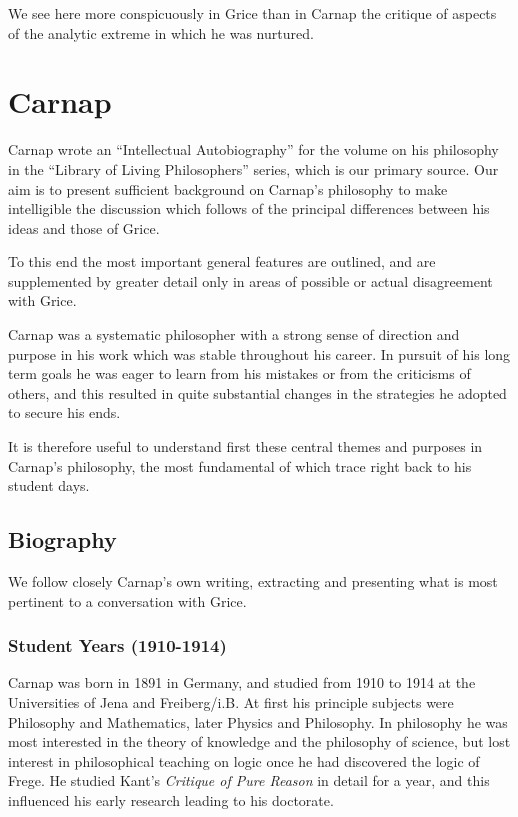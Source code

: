 \documentclass[10pt,titlepage]{book}
\begin{document}
We see here more conspicuously in Grice than in Carnap the critique of aspects of the analytic extreme in which he was nurtured.


\chapter{Carnap}

Carnap wrote an ``Intellectual Autobiography''\cite{carnap63} for the volume on his philosophy\cite{carnap63a} in the ``Library of Living Philosophers'' series, which is our primary source.
Our aim is to present sufficient background on Carnap's philosophy to make intelligible the discussion which follows of the principal differences between his ideas and those of Grice.

To this end the most important general features are outlined, and are supplemented by greater detail only in areas of possible or actual disagreement with Grice.

Carnap was a systematic philosopher with a strong sense of direction and purpose in his work which was stable throughout his career.
In pursuit of his long term goals he was eager to learn from his mistakes or from the criticisms of others, and this resulted in quite substantial changes in the strategies he adopted to secure his ends.

It is therefore useful to understand first these central themes and purposes in Carnap's philosophy, the most fundamental of which trace right back to his student days.

\section{Biography}

We follow closely Carnap's own writing, extracting and presenting what is most pertinent to a conversation with Grice.

\subsection{Student Years (1910-1914)}

Carnap was born in 1891 in Germany, and studied from 1910 to 1914 at the Universities of Jena and Freiberg/i.B.
At first his principle subjects were Philosophy and Mathematics, later Physics and Philosophy.
In philosophy he was most interested in the theory of knowledge and the philosophy of science, but lost interest in philosophical teaching on logic once he had discovered the logic of Frege.
He studied Kant's \emph{Critique of Pure Reason} in detail for a year, and this influenced his early research leading to his doctorate.
\end{document}
